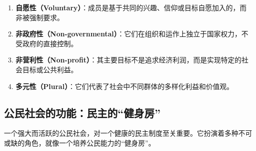 \begin{enumerate}
    \item \textbf{自愿性（Voluntary）}：成员是基于共同的兴趣、信仰或目标自愿加入的，而非被强制要求。
    \item \textbf{非政府性（Non-governmental）}：它们在组织和运作上独立于国家权力，不受政府的直接控制。
    \item \textbf{非营利性（Non-profit）}：其主要目标不是追求经济利润，而是实现特定的社会目标或公共利益。
    \item \textbf{多元性（Plural）}：它们代表了社会中不同群体的多样化利益和价值观。
\end{enumerate}

\subsection{公民社会的功能：民主的“健身房”}

一个强大而活跃的公民社会，对一个健康的民主制度至关重要。它扮演着多种不可或缺的角色，就像一个培养公民能力的“健身房”。

